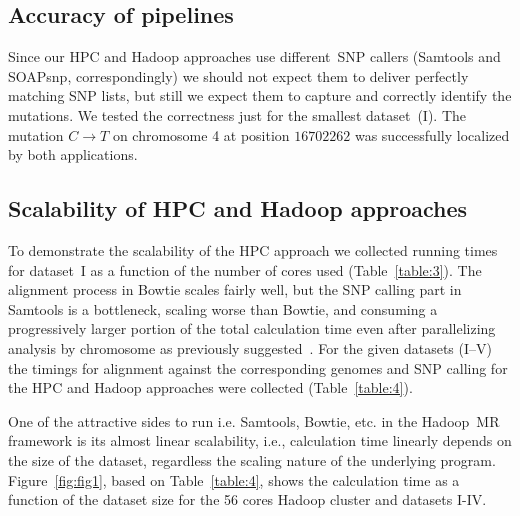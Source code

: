 \documentclass[10pt]{article}
\newcommand{\COM}[1]{{\color{blue} #1 }}
\begin{document}
\subsection*{Accuracy of pipelines}
Since our HPC and Hadoop approaches use different~SNP callers (Samtools and SOAPsnp, correspondingly) we should not expect them to deliver perfectly matching SNP lists, but still we expect them to capture and correctly identify the mutations. We tested the correctness just for the smallest dataset~(I). The mutation $C\rightarrow T$ on chromosome 4 at position $16702262$\cite{schneeberger} was successfully localized by both applications.



\subsection*{Scalability of HPC and Hadoop approaches}
To demonstrate the scalability of the HPC approach we collected running times for dataset~I as a function of the number of cores used (Table~\ref{table:3}). 
The alignment process in Bowtie scales fairly well, but the SNP calling part in Samtools is a bottleneck, scaling worse than Bowtie, and consuming a progressively larger portion of the total calculation time even after parallelizing analysis by chromosome as previously suggested~\cite{biostars_samtools}.
For the given datasets (I--V) the timings for alignment against the corresponding genomes and SNP calling for the HPC and Hadoop approaches were collected (Table~\ref{table:4}).

One of the attractive sides to run i.e. Samtools, Bowtie, etc. in the  Hadoop~MR framework is its almost linear scalability, i.e., calculation time linearly depends on the size of the dataset\cite{Langmead:2009kx,Pireddu:2011vn}, regardless the scaling nature of the underlying program.
Figure~\ref{fig:fig1}, based on Table~\ref{table:4}, shows the calculation time as a function of the dataset size for the 56 cores Hadoop cluster and datasets I-IV.
\end{document}
